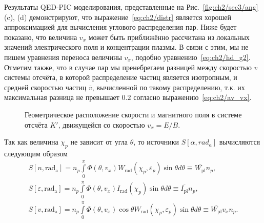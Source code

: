Результаты QED-PIC моделирования, представленные на Рис.~\ref{fig:ch2/sec3/ang} (c), (d) демонстрируют, что выражение~\eqref{eq:ch2/distr} является хорошей аппроксимацией для вычисления углового распределения пар.
Ниже будет показано, что величина $v_x$ может быть приближённо рассчитана из локальных значений электрического поля и концентрации плазмы.
В связи с этим, мы не пишем уравнения переноса величины $v_x$, подобно уравнению~\eqref{eq:ch2/hd_g2}.
Отметим также, что в случае пар мы пренебрегаем разницей между скоростью $v$ системы отсчёта, в которой распределение частиц является изотропным, и средней скоростью частиц $\overline{v}$, вычисленной по такому распределению, т.к. их максимальная разница не превышает $0.2$ согласно выражению~\eqref{eq:ch2/av_vx}.

\begin{figure}
    \caption[Геометрическое расположение скорости и магнитного поля в системе отсчёта $K'$]{\label{fig:ch2/sec3/plasma} Геометрическое расположение скорости и магнитного поля в системе отсчёта $K'$, движущейся со скоростью $v_x=E/B$.}
\end{figure}

Так как величина $\chi_p$ не зависит от угла $\theta$, то источники $S[\alpha, rad_a]$ вычисляются следующим образом
\begin{align}
    S[n, \mathrm{rad_a}] = n_p \int\limits_0^\pi \Phi(\theta, v_x) W_\mathrm{rad}(\chi_p, \varepsilon_p)  \sin\theta d\theta \equiv \overline{W_\mathrm{pl}} n_p, \\
    S[\varepsilon, \mathrm{rad_a}] =  n_p \int\limits_0^\pi \Phi(\theta, v_x) I_\mathrm{rad}(\chi_p)  \sin\theta d\theta \equiv \overline{I_\mathrm{pl}} n_p, \\
    S[v, \mathrm{rad_a}] =  n_p \int\limits_0^\pi \Phi(\theta, v_x) \cos\theta W_\mathrm{rad}(\chi_p, \varepsilon_p)  \sin\theta d\theta  \equiv \overline{W_\mathrm{pl}} v_x n_p.
\end{align}

